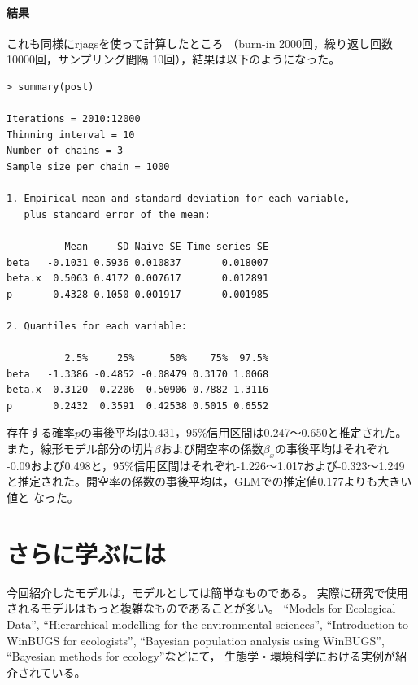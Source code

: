 \documentclass[11pt,uplatex]{jsarticle}
\begin{document}
\paragraph{結果}
これも同様に\textsf{rjags}を使って計算したところ
（burn-in 2000回，繰り返し回数 10000回，サンプリング間隔 10回），結果は以下のようになった。

\begin{lstlisting}
> summary(post)

Iterations = 2010:12000
Thinning interval = 10 
Number of chains = 3 
Sample size per chain = 1000 

1. Empirical mean and standard deviation for each variable,
   plus standard error of the mean:

          Mean     SD Naive SE Time-series SE
beta   -0.1031 0.5936 0.010837       0.018007
beta.x  0.5063 0.4172 0.007617       0.012891
p       0.4328 0.1050 0.001917       0.001985

2. Quantiles for each variable:

          2.5%     25%      50%    75%  97.5%
beta   -1.3386 -0.4852 -0.08479 0.3170 1.0068
beta.x -0.3120  0.2206  0.50906 0.7882 1.3116
p       0.2432  0.3591  0.42538 0.5015 0.6552

\end{lstlisting}
存在する確率$p$の事後平均は0.431，95\%信用区間は0.247〜0.650と推定された。
また，線形モデル部分の切片$\beta$および開空率の係数$\beta_{x}$の事後平均はそれぞれ
-0.09および0.498と，95\%信用区間はそれぞれ-1.226〜1.017および-0.323〜1.249
と推定された。開空率の係数の事後平均は，GLMでの推定値0.177よりも大きい値と
なった。


\section{さらに学ぶには}

今回紹介したモデルは，モデルとしては簡単なものである。
実際に研究で使用されるモデルはもっと複雑なものであることが多い。
``Models for Ecological Data''\cite{Clark},
``Hierarchical modelling for the environmental sciences''\cite{Clark_Gelfand},
``Introduction to WinBUGS for ecologists''\cite{IWE},
``Bayesian population analysis using WinBUGS''\cite{BPA},
``Bayesian methods for ecology''\cite{McCarthy}などにて，
生態学・環境科学における実例が紹介されている。
\end{document}
